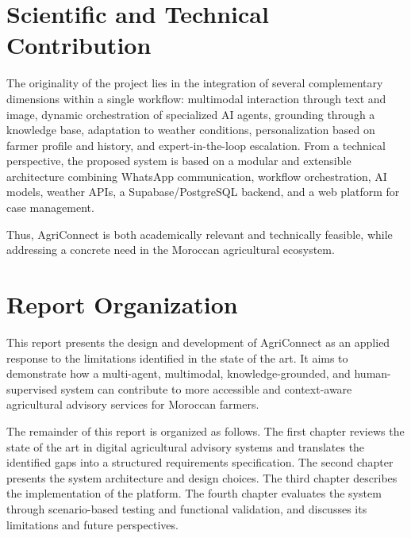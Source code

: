 \section{Scientific and Technical Contribution}

The originality of the project lies in the integration of several complementary dimensions within a single workflow: multimodal interaction through text and image, dynamic orchestration of specialized AI agents, grounding through a knowledge base, adaptation to weather conditions, personalization based on farmer profile and history, and expert-in-the-loop escalation. From a technical perspective, the proposed system is based on a modular and extensible architecture combining WhatsApp communication, workflow orchestration, AI models, weather APIs, a Supabase/PostgreSQL backend, and a web platform for case management.

Thus, AgriConnect is both academically relevant and technically feasible, while addressing a concrete need in the Moroccan agricultural ecosystem.

\section{Report Organization}

This report presents the design and development of AgriConnect as an applied response to the limitations identified in the state of the art. It aims to demonstrate how a multi-agent, multimodal, knowledge-grounded, and human-supervised system can contribute to more accessible and context-aware agricultural advisory services for Moroccan farmers.

The remainder of this report is organized as follows. The first chapter reviews the state of the art in digital agricultural advisory systems and translates the identified gaps into a structured requirements specification. The second chapter presents the system architecture and design choices. The third chapter describes the implementation of the platform. The fourth chapter evaluates the system through scenario-based testing and functional validation, and discusses its limitations and future perspectives.
